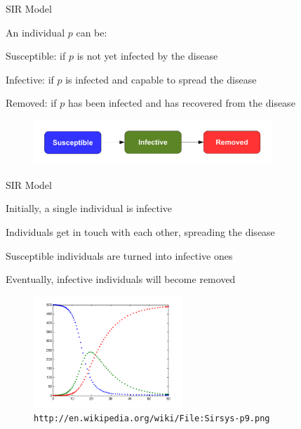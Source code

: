 \begin{frame}{SIR Model}

\begin{definition}
An individual $p$ can be:
\BIL
\item \alert{Susceptible}: if $p$ is not yet infected by the disease
\item \alert{Infective}: if $p$ is infected and capable to spread the disease
\item \alert{Removed}: if $p$ has been infected and has recovered from the disease
\EIL
\end{definition}

\begin{figure}
	\includegraphics[width=0.8\textwidth]{figs/05/model-sir}
\end{figure}

\end{frame}

\begin{frame}{SIR Model}

\BI
\item Initially, a single individual is infective
\item Individuals get in touch with each other, spreading the disease
\item Susceptible individuals are turned into infective ones
\item Eventually, infective individuals will become removed
\EI

\begin{figure}
	\includegraphics[width=0.5\textwidth]{figs/05/model-sir-data}\\
	\vspace{-0.5cm}
	\texttt{\tiny http://en.wikipedia.org/wiki/File:Sirsys-p9.png}
\end{figure}


\end{frame}


